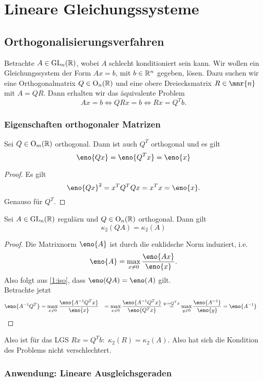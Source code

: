 \chapter{Lineare Gleichungssysteme}
\section{Orthogonalisierungsverfahren}


Betrachte $A\in \operatorname{GL}_{n}(\mathbb{R})$, wobei $A$ schlecht konditioniert sein kann. Wir wollen ein Gleichungssystem der Form $Ax=b$, mit $b\in \mathbb{R}^n$ gegeben, lösen. Dazu suchen wir eine Orthogonalmatrix $Q\in \operatorname{O}_{n}(\mathbb{R})$ und eine obere Dreiecksmatrix $R\in \mnr{n}$ mit $A=QR$. Dann erhalten wir das äquivalente Problem
\[
Ax=b \Longleftrightarrow QRx=b \Longleftrightarrow Rx=Q^T b.
\]

\subsection{Eigenschaften orthogonaler Matrizen}
\begin{lem}\label{1:iso}
	Sei $Q\in \operatorname{O}_{m}(\mathbb{R})$ orthogonal. Dann ist auch $Q^T$ orthogonal und es gilt
	\[
		\eno{Qx}= \eno{Q^Tx}=\eno{x}
	\]
\end{lem}
\begin{proof}
	Es gilt
	\[
	\eno{Qx}^2 = x^TQ^TQx = x^Tx=\eno{x}.
	\]
	Genauso für $Q^T$.
\end{proof}
\begin{lem}
	Sei $A\in \operatorname{GL}_{n}(\mathbb{R})$ regulärn und $Q\in \operatorname{O}_{n}(\mathbb{R})$ orthogonal. Dann gilt
	\[ \kappa_2(QA)=\kappa_2(A)
	\]
\end{lem}
\begin{proof}
	Die Matrixnorm $\eno{A}$ ist durch die euklidsche Norm induziert, i.e.
	\[
	\eno{A} = \max_{x\neq 0} \frac{\eno{Ax}}{\eno{x}}.
	\]
	Also folgt aus \cref{1:iso}, dass $\eno(QA)=\eno(A)$ gilt.\\
	Betrachte jetzt
	\begin{align*}
		\eno{A^{-1}Q^T} &= \max_{x\neq 0}\frac{\eno{A^{-1}Q^Tx}}{\eno{x}}
										&= \max_{x\neq 0}\frac{\eno{A^{-1}Q^Tx}}{\eno{Q^Tx}}
										&\overset{y:=Q^Tx}=  \max_{y\neq 0} \frac{\eno{A^{-1}}}{\eno{y}} = \eno{A^{-1}}
	\end{align*}
\end{proof}
Also ist für das LGS $Rx=Q^Tb:$ $\kappa_2(R)=\kappa_2(A)$. Also hat sich die Kondition des Problems nicht verschlechtert.

\subsection{Anwendung: Lineare Ausgleichsgeraden}


